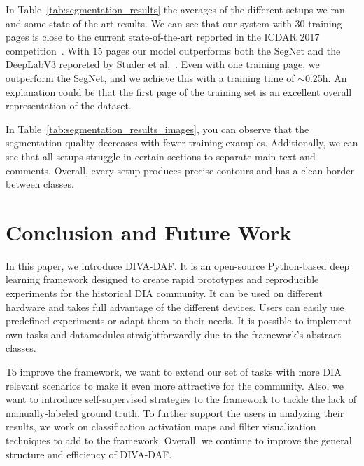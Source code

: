 \documentclass[runningheads]{llncs}
\begin{document}
In Table~\ref{tab:segmentation_results} the averages of the different setups we ran and some state-of-the-art results.
We can see that our system with 30 training pages is close to the current state-of-the-art reported in the ICDAR 2017 competition~\cite{simistiraICDAR2017CompetitionLayout2017}.
With 15 pages our model outperforms both the SegNet and the DeepLabV3 reporeted by Studer et al.~\cite{studerComprehensiveStudyImageNet2019a}.
Even with one training page, we outperform the SegNet, and we achieve this with a training time of $\sim$0.25h.
An explanation could be that the first page of the training set is an excellent overall representation of the dataset.

In Table~\ref{tab:segmentation_results_images}, you can observe that the segmentation quality decreases with fewer training examples.
Additionally, we can see that all setups struggle in certain sections to separate main text and comments.
Overall, every setup produces precise contours and has a clean border between classes.

 
\section{Conclusion and Future Work}
In this paper, we introduce DIVA-DAF. 
It is an open-source Python-based deep learning framework designed to create rapid prototypes and reproducible experiments for the historical \ac{DIA} community. 
It can be used on different hardware and takes full advantage of the different devices.
Users can easily use predefined experiments or adapt them to their needs.
It is possible to implement own tasks and datamodules straightforwardly due to the framework's abstract classes.


To improve the framework, we want to extend our set of tasks with more \ac{DIA} relevant scenarios to make it even more attractive for the community.
Also, we want to introduce self-supervised strategies to the framework to tackle the lack of manually-labeled ground truth.
To further support the users in analyzing their results, we work on classification activation maps and filter visualization techniques to add to the framework.
Overall, we continue to improve the general structure and efficiency of DIVA-DAF.
 





\end{document}

